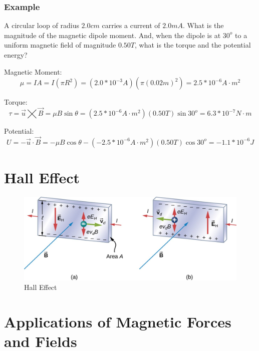 \documentclass[14pt]{memoir}
\begin{document}
\subsubsection{Example}

A circular loop of radius $2.0cm$ carries a current of $2.0mA$. What is the magnitude of the magnetic dipole moment. And, when the dipole is at $30^o$ to a uniform magnetic field of magnitude $0.50T$, what is the torque and the potential energy?

Magnetic Moment:
\begin{equation}
\mu = IA = I(\pi R^2) = (2.0*10^{-3}A)(\pi (0.02m)^2) = 2.5 * 10^{-6} A \cdot m^2
\end{equation}

Torque:
\begin{equation}
\tau = \vec{u} \bigtimes \vec{B} = \mu B \sin{\theta} = (2.5 * 10^{-6} A \cdot m^2) (0.50T)\sin{30^o} = 6.3 * 10^{-7} N\cdot m
\end{equation}

Potential: 
\begin{equation}
U = -\vec{u} \cdot \vec{B} = -\mu B \cos{\theta} - (-2.5 * 10^{-6} A \cdot m^2)(0.50T)\cos{30^o} = -1.1 * 10^{-6} J 
\end{equation}


\section{Hall Effect}

\begin{figure}[H]
\begin{center}
\includegraphics[scale=0.50]{fig/fig_11_17.jpg}
\caption{Hall Effect}
\label{fig:11_17}
\end{center}
\end{figure}

\section{Applications of Magnetic Forces and Fields}
\end{document}
